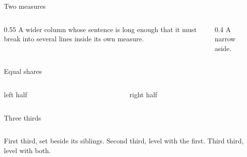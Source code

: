 \documentclass[aspectratio=169]{slides}
\begin{document}
\begin{frame}{Two measures}
\begin{columns}[T]
\begin{column}{0.55\textwidth}
A wider column whose sentence is long enough that it must break into
several lines inside its own measure.
\end{column}
\begin{column}{0.4\textwidth}
A narrow aside.
\end{column}
\end{columns}
\end{frame}

\begin{frame}{Equal shares}
\begin{columns}
\begin{column}
left half
\end{column}
\begin{column}
right half
\end{column}
\end{columns}
\end{frame}

\begin{frame}{Three thirds}
\begin{columns}[T,onlytextwidth]
First third, set beside its siblings.
Second third, level with the first.
Third third, level with both.
\end{columns}
\end{frame}
\end{document}
